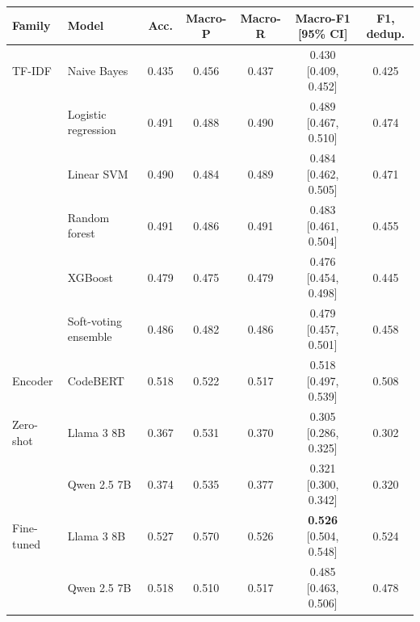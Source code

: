 \begin{tabular*}{\tblwidth}{@{\extracolsep{\fill}} llccccc @{}}
\toprule
Family & Model & Acc. & Macro-P & Macro-R & Macro-F1 [95\% CI] & F1, dedup. \\
\midrule
TF-IDF & Naive Bayes & 0.435 & 0.456 & 0.437 & 0.430 [0.409, 0.452] & 0.425 \\
 & Logistic regression & 0.491 & 0.488 & 0.490 & 0.489 [0.467, 0.510] & 0.474 \\
 & Linear SVM & 0.490 & 0.484 & 0.489 & 0.484 [0.462, 0.505] & 0.471 \\
 & Random forest & 0.491 & 0.486 & 0.491 & 0.483 [0.461, 0.504] & 0.455 \\
 & XGBoost & 0.479 & 0.475 & 0.479 & 0.476 [0.454, 0.498] & 0.445 \\
 & Soft-voting ensemble & 0.486 & 0.482 & 0.486 & 0.479 [0.457, 0.501] & 0.458 \\
\midrule
Encoder & CodeBERT & 0.518 & 0.522 & 0.517 & 0.518 [0.497, 0.539] & 0.508 \\
\midrule
Zero-shot & Llama 3 8B & 0.367 & 0.531 & 0.370 & 0.305 [0.286, 0.325] & 0.302 \\
 & Qwen 2.5 7B & 0.374 & 0.535 & 0.377 & 0.321 [0.300, 0.342] & 0.320 \\
\midrule
Fine-tuned & Llama 3 8B & 0.527 & 0.570 & 0.526 & \textbf{0.526} [0.504, 0.548] & 0.524 \\
 & Qwen 2.5 7B & 0.518 & 0.510 & 0.517 & 0.485 [0.463, 0.506] & 0.478 \\
\bottomrule
\end{tabular*}
